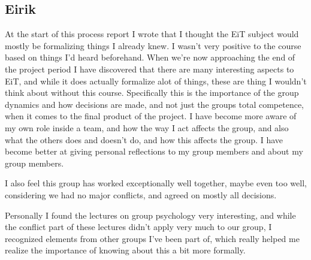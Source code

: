 \subsection{Eirik}
At the start of this process report I wrote that I thought the EiT subject would mostly be formalizing things I already knew. I wasn't very positive to the course based on things I'd heard beforehand. When we're now approaching the end of the project period I have discovered that there are many interesting aspects to EiT, and while it does actually formalize alot of things, these are thing I wouldn't think about without this course. Specifically this is the importance of the group dynamics and how decisions are made, and not just the groups total competence, when it comes to the final product of the project. I have become more aware of my own role inside a team, and how the way I act affects the group, and also what the others does and doesn't do, and how this affects the group. I have become better at giving personal reflections to my group members and about my group members.

I also feel this group has worked exceptionally well together, maybe even too well, considering we had no major conflicts, and agreed on mostly all decisions. 

Personally I found the lectures on group psychology very interesting, and while the conflict part of these lectures didn't apply very much to our group, I recognized elements from other groups I've been part of, which really helped me realize the importance of knowing about this a bit more formally.